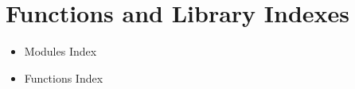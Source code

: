\documentclass[letterpaper,10pt,english]{sphinxmanual}
\begin{document}
\chapter{Functions and Library Indexes}
\label{index:functions-and-library-indexes}\begin{itemize}
\item {} 
Modules Index

\item {} 
Functions Index

\end{itemize}



\renewcommand{\indexname}{Index}
\printindex
\end{document}
